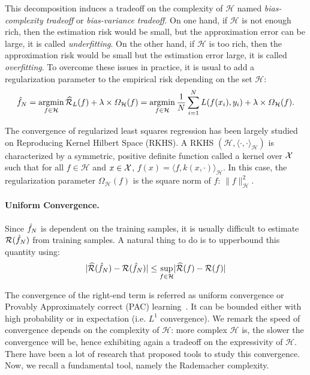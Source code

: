 This decomposition induces a tradeoff on the complexity of $\mathcal{H}$ named \emph{bias-complexity tradeoff} or \emph{bias-variance tradeoff}. On one hand, if $\mathcal{H}$ is not enough rich, then the estimation risk would be small, but the approximation error can be large, it is called \emph{underfitting}. On the other hand, if $\mathcal{H}$ is too rich, then the approximation risk would be small but the estimation error large, it is called \emph{overfitting}. To overcome these issues in practice, it is usual to add a regularization parameter to the empirical risk depending on the set $\mathcal{H}$:
\begin{align*}
    \hat{f}_N = \operatorname*{argmin}_{f\in\mathcal{H}}\widehat{\mathcal{R}}_{L}(f) +\lambda\times\Omega_\mathcal{H}(f)= \operatorname*{argmin}_{f\in\mathcal{H}}\frac{1}{N}\sum_{i=1}^N L(f(x_i),y_i)+\lambda\times\Omega_\mathcal{H}(f).
\end{align*}

The convergence of regularized least squares regression has been largely studied on Reproducing Kernel Hilbert Space (RKHS). A RKHS $(\mathcal{H},\langle\cdot,\cdot\rangle_\mathcal{H})$ is characterized by a symmetric, positive definite function called a kernel over $\mathcal{X}$ such that for all $f\in\mathcal{H}$ and $x\in\mathcal{X}$, $f(x)= \langle f,k(x,\cdot)\rangle_\mathcal{H}$. In this case, the regularization parameter $\Omega_\mathcal{H}(f)$ is the square norm of $f$: $\lVert f\rVert_\mathcal{H}^2$. 


\paragraph{Uniform Convergence.} Since $\hat{f}_N$ is dependent on the training samples, it is usually difficult to estimate $\mathcal{R}(\hat{f}_N)$ from training samples. A natural thing to do is to upperbound this quantity using:
\begin{align*}
    \lvert\widehat{\mathcal{R}}(\hat{f}_N) - \mathcal{R}(\hat{f}_N)\rvert\leq\sup_{f\in\mathcal{H}}    \lvert\widehat{\mathcal{R}}(f) - \mathcal{R}(f)\rvert
\end{align*}

The convergence of the right-end term is referred as uniform convergence or Provably Approximately correct (PAC) learning~\citep{valiant1984theory}. It can be bounded either with high probability or in expectation (i.e. $L^1$ convergence). We remark the speed of convergence depends on the complexity of $\mathcal{H}$: more complex $\mathcal{H}$ is, the slower the convergence will be, hence exhibiting again a tradeoff on the expressivity of $\mathcal{H}$. There have been a  lot of research that proposed tools to study this convergence. Now, we recall a fundamental tool, namely the Rademacher complexity.



